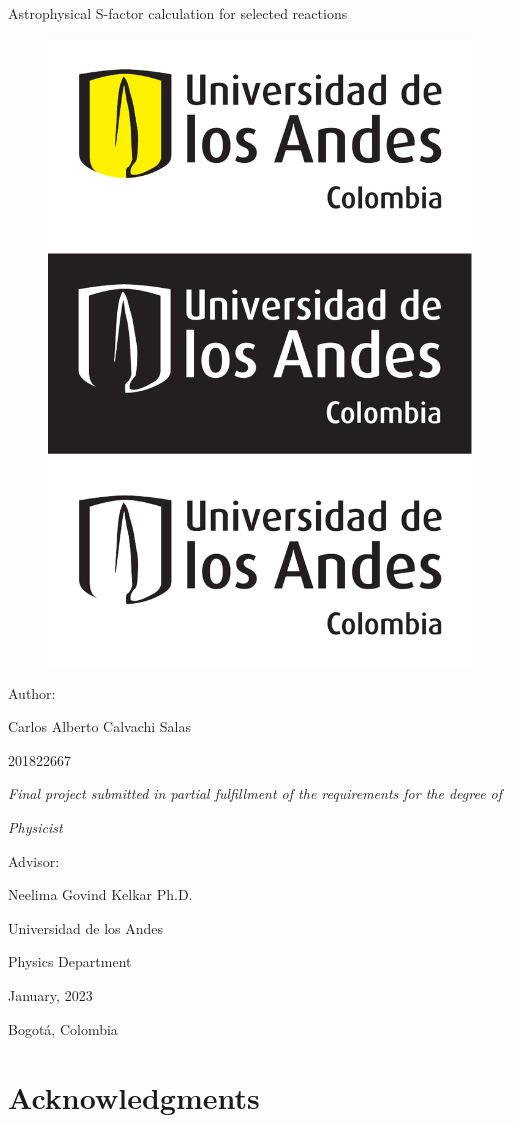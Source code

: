 \documentclass[openany]{book}
\begin{document}
		\begin{titlepage}
		\centering
		
		{\Huge Astrophysical S-factor calculation for selected reactions  \par}
		
		\begin{figure}[H]
			\centering
			\includegraphics[width=0.5\linewidth]{logo.pdf}
			\label{fig:logo}
		\end{figure}
		{\Large Author:  \par}
		{\Large Carlos Alberto Calvachi Salas \par}
		{\Large 201822667 \par}
		\vfill
		{\Large\textit{Final project submitted in partial fulfillment of the requirements for the degree of} \par}
		\vfill
		{\Large\textit{Physicist} \par}
		\vfill
		{\Large Advisor:  \par}
		{\Large Neelima Govind Kelkar Ph.D. \par}
		\vfill
		{\Large Universidad de los Andes  \par}
		{\Large Physics Department  \par}
		{\Large January, 2023  \par}
		{\Large Bogotá, Colombia \par}
	\end{titlepage}


\chapter*{Acknowledgments}
\end{document}
